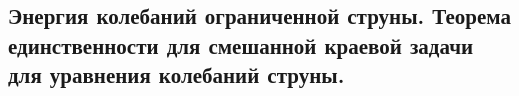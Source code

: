 \subsection{Энергия колебаний ограниченной струны. Теорема единственности для смешанной краевой задачи для уравнения колебаний струны.}